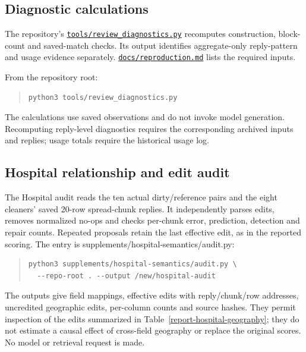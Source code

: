 \documentclass[10pt,a4paper]{article}
\begin{document}
\subsection{Diagnostic calculations}\label{report-diagnostics}

The repository's \href{https://github.com/hinsonver/CoRe-Benchmark/blob/main/tools/review_diagnostics.py}{\nolinkurl{tools/review_diagnostics.py}} recomputes construction, block-count and saved-match checks. Its output identifies aggregate-only reply-pattern and usage evidence separately. \href{https://github.com/hinsonver/CoRe-Benchmark/blob/main/docs/reproduction.md}{\nolinkurl{docs/reproduction.md}} lists the required inputs.

From the repository root:

\begin{quote}
\begin{Verbatim}[fontsize=\footnotesize,fontfamily=cmtt,formatcom={\fontencoding{OT1}\selectfont\def\textasciigrave{\char18}\def\textquotesingle{\char13}}]
python3 tools/review_diagnostics.py
\end{Verbatim}
\end{quote}

The calculations use saved observations and do not invoke model generation. Recomputing reply-level diagnostics requires the corresponding archived inputs and replies; usage totals require the historical usage log.

\subsection{Hospital relationship and edit audit}\label{report-hospital-audit-entry}

The Hospital audit reads the ten actual dirty/reference pairs and the eight cleaners' saved
20-row spread-chunk replies. It independently parses edits, removes normalized no-ops and
checks per-chunk error, prediction, detection and repair counts. Repeated proposals retain
the last effective edit, as in the reported scoring. The entry is
{\ttfamily\small supplements/hospital-semantics/audit.py}:

\begin{quote}
\begin{Verbatim}[fontsize=\footnotesize]
python3 supplements/hospital-semantics/audit.py \
  --repo-root . --output /new/hospital-audit
\end{Verbatim}
\end{quote}

The outputs give field mappings, effective edits with reply/chunk/row addresses, uncredited
geographic edits, per-column counts and source hashes. They permit inspection of the edits
summarized in Table~\ref{report-hospital-geography}; they do not estimate a causal effect of
cross-field geography or replace the original scores. No model or retrieval request is made.
\end{document}

